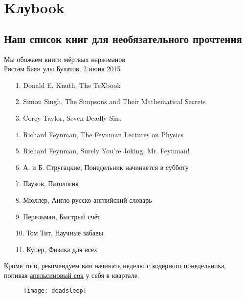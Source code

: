 \section*{Kлуbook} 
\subsection*{Наш список книг для необязательного прочтения} %
\begin{epigraph}
    Мы обожаем книги мёртвых наркоманов\\
    {\normalfont Рөстәм Баян улы Булатов, 2 июня 2015}
\end{epigraph}

\begin{itemize}
        \item[1.] Donald E. Knuth, The {\TeX}book
        \item[2.] Simon Singh, The Simpsons and Their Mathematical Secrets
        \item[3.] Corey Taylor, Seven Deadly Sins 
        \item[4.] Richard Feynman, The Feynman Lectures on Physics
        \item[5.] Richard Feynman, Surely You're Joking, Mr. Feynman!
        \item[6.] А. и Б. Стругацкие, Понедельник начинается в субботу
        \item[7.] Пауков, Патология
        \item[8.] Мюллер, Англо-русско-английский словарь
        \item[9.] Перельман, Быстрый счёт
        \item[10.] Том Тит, Научные забавы
        \item[11.] Купер, Физика для всех
\end{itemize}

Кроме того, рекомендуем вам начинать неделю с 
\href{https://freecx.github.io/}{кодерного понедельника},
попивая \href{https://citrux.github.io/blog/}{апельсиновый сок} у себя в квартале.

\begin{figure}[ht!]
    \centering
    \texttt{[image: deadsleep]}
\end{figure}

